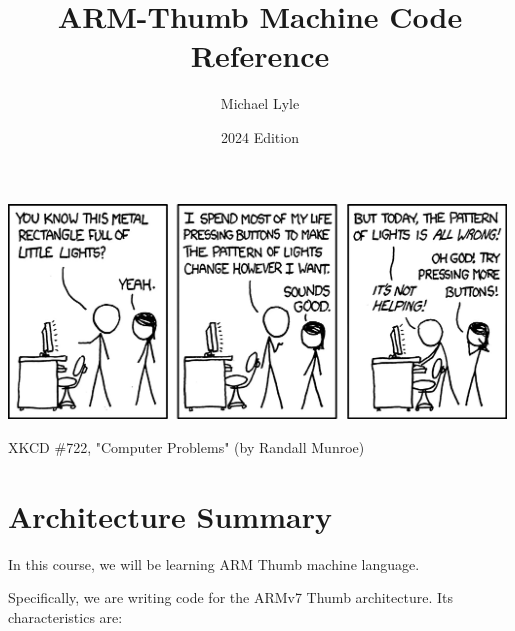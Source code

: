 \documentclass[12pt]{article}
\title{ARM-Thumb Machine Code Reference}
\author{Michael Lyle}
\date{2024 Edition}
\begin{document}
\maketitle
{
\setlength{\parskip}{0pt}%
\tableofcontents
}
\vspace{3.2cm}
\begin{center}
\includegraphics[width=5.2in]{computer_problems.png}

\scriptsize{XKCD \#722, "Computer Problems" (by Randall Munroe)}
\end{center}

\newpage

\section{Architecture Summary}

In this course, we will be learning ARM Thumb machine language.

Specifically, we are writing code for the ARMv7 Thumb architecture.  Its characteristics are:
\end{document}
